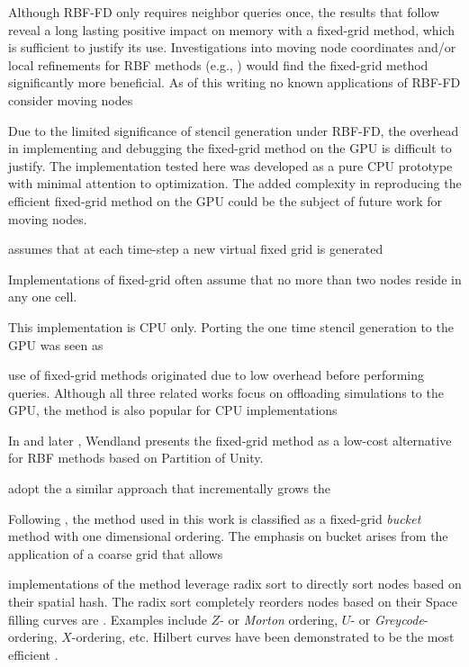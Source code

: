 \documentclass{report}
\begin{document}
Although RBF-FD only requires neighbor queries once, the results that follow reveal a long lasting positive impact on memory with a fixed-grid method, which is sufficient to justify its use. Investigations into moving node coordinates and/or local refinements for RBF methods (e.g., \cite{FlyerLehto10}) would find the fixed-grid method significantly more beneficial. As of this writing no known applications of RBF-FD consider moving nodes

Due to the limited significance of stencil generation under RBF-FD, the overhead in implementing and debugging the fixed-grid method on the GPU is difficult to justify. The implementation tested here was developed as a pure CPU prototype with minimal attention to optimization. The added complexity in reproducing the efficient fixed-grid method on the GPU could be the subject of future work for moving nodes. 

    
\cite{Krog2010} assumes that at each time-step a new virtual fixed grid is generated 


Implementations of fixed-grid often assume that no more than two nodes reside in any one cell.  

This implementation is CPU only. Porting the one time stencil generation to the GPU was seen as 

use of fixed-grid methods originated due to low overhead before performing queries.
Although all three related works focus on offloading simulations to the GPU, the method is also popular for CPU implementations 

In \cite{Wendland2002} and later \cite{WendlandBook}, Wendland presents the fixed-grid method as a low-cost alternative for RBF methods based on Partition of Unity. %

\cite{Purcell2003} adopt the a similar approach that incrementally grows the 

Following \cite{Samet2005}, the method used in this work is classified as a fixed-grid \emph{bucket} method with one dimensional ordering. The emphasis on bucket arises from the application of a coarse grid that allows 

 implementations of the method leverage radix sort to directly sort nodes based on their spatial hash. The radix sort completely reorders nodes based on their 
Space filling curves are . Examples include $Z$- or \emph{Morton} ordering, $U$- or \emph{Greycode}-ordering, $X$-ordering, etc. Hilbert curves have been demonstrated to be the most efficient \cite{INREFS}. 
\end{document}
